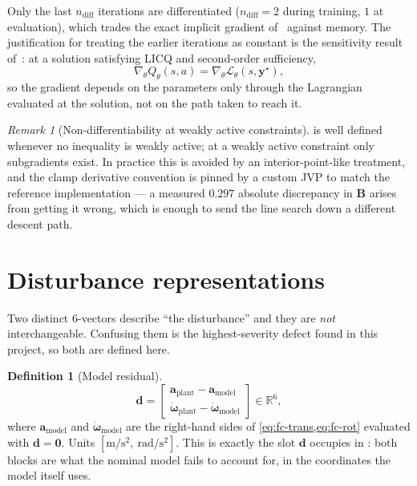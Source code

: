 \documentclass[11pt,a4paper,twoside,openright]{report}
\newcommand{\R}{\mathbb{R}}
\renewcommand{\vec}[1]{\bm{#1}}
\newcommand{\mat}[1]{\bm{#1}}
\newcommand{\dres}{\vec{d}}
\newcommand{\bodyrate}{\vec{\omega}}
\theoremstyle{plain}
\theoremstyle{definition}
\newtheorem{definition}[theorem]{Definition}
\theoremstyle{remark}
\newtheorem{remark}[theorem]{Remark}
\begin{document}
	Only the last $n_\mathrm{diff}$ iterations are differentiated
	($n_\mathrm{diff}=2$ during training, $1$ at evaluation), which trades the exact
	implicit gradient of~\cite{amos2018differentiable} against memory. The
	justification for treating the earlier iterations as constant is the sensitivity
	result of~\cite{buskens2001sensitivity}: at a solution satisfying LICQ and
	second-order sufficiency,
	\begin{equation}
		\nabla_\theta Q_\theta(s,a)=\nabla_\theta\mathcal L_\theta(s,\vec y^{\star}),
		\label{eq:sensitivity}
	\end{equation}
	so the gradient depends on the parameters only through the Lagrangian evaluated
	at the solution, not on the path taken to reach it.

	\begin{remark}[Non-differentiability at weakly active constraints]
		 is well defined whenever no inequality is weakly active;
		at a weakly active constraint only subgradients exist. In practice this is
		avoided by an interior-point-like treatment, and the clamp derivative convention
		is pinned by a custom JVP to match the reference implementation --- a measured
		$0.297$ absolute discrepancy in $\mat B$ arises from getting it wrong, which is
		enough to send the line search down a different descent path.
	\end{remark}

	\section{Disturbance representations}
	\label{sec:disturbance}

	Two distinct $6$-vectors describe ``the disturbance'' and they are \emph{not}
	interchangeable. Confusing them is the highest-severity defect found in this
	project, so both are defined here.

	\begin{definition}[Model residual]
		\label{def:residual}
		\begin{equation}
			\dres=\begin{bmatrix}
				\vec a_\mathrm{plant}-\vec a_\mathrm{model}\\
				\dot{\bodyrate}_\mathrm{plant}-\dot{\bodyrate}_\mathrm{model}
			\end{bmatrix}\in\R^6,
			\label{eq:dres}
		\end{equation}
		where $\vec a_\mathrm{model}$ and $\dot{\bodyrate}_\mathrm{model}$ are the
		right-hand sides of \cref{eq:fc-trans,eq:fc-rot} evaluated with
		$\dres=\vec 0$. Units $[\si{\metre\per\square\second},\
		\si{\radian\per\square\second}]$. This is exactly the slot $\dres$ occupies in
		\crefrange{eq:fc-trans}{eq:fc-rot}: both blocks are what the nominal model
		fails to account for, in the coordinates the model itself uses.
	\end{definition}
\end{document}
